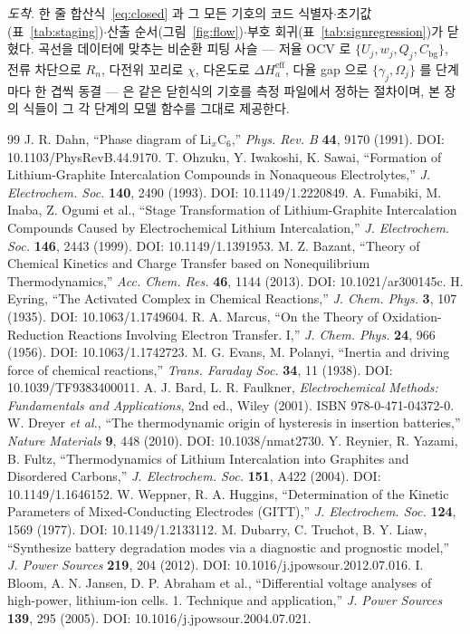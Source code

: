 \documentclass[11pt,a4paper]{article}
\newcommand{\eff}{\mathrm{eff}}
\newcommand{\bg}{\mathrm{bg}}
\begin{document}
\medskip
\emph{도착.} 한 줄 합산식~\eqref{eq:closed} 과 그 모든 기호의 코드 식별자$\cdot$초기값(표~\ref{tab:staging})$\cdot$산출 순서(그림~\ref{fig:flow})$\cdot$부호 회귀(표~\ref{tab:signregression})가 닫혔다. 곡선을 데이터에 맞추는 비순환 피팅 사슬 — 저율 OCV 로 $\{U_j,w_j,Q_j,C_\bg\}$, 전류 차단으로 $R_n$, 다전위 꼬리로 $\chi$, 다온도로 $\Delta H_a^\eff$, 다율 gap 으로 $\{\gamma_j,\Omega_j\}$ 를 단계마다 한 겹씩 동결 — 은 같은 닫힌식의 기호를 측정 파일에서 정하는 절차이며, 본 장의 식들이 그 각 단계의 모델 함수를 그대로 제공한다.

\begin{thebibliography}{99}
 J. R. Dahn, ``Phase diagram of Li$_x$C$_6$,'' \emph{Phys. Rev. B} \textbf{44}, 9170 (1991). DOI: 10.1103/PhysRevB.44.9170.
 T. Ohzuku, Y. Iwakoshi, K. Sawai, ``Formation of Lithium-Graphite Intercalation Compounds in Nonaqueous Electrolytes,'' \emph{J. Electrochem. Soc.} \textbf{140}, 2490 (1993). DOI: 10.1149/1.2220849.
 A. Funabiki, M. Inaba, Z. Ogumi et al., ``Stage Transformation of Lithium-Graphite Intercalation Compounds Caused by Electrochemical Lithium Intercalation,'' \emph{J. Electrochem. Soc.} \textbf{146}, 2443 (1999). DOI: 10.1149/1.1391953.
 M. Z. Bazant, ``Theory of Chemical Kinetics and Charge Transfer based on Nonequilibrium Thermodynamics,'' \emph{Acc. Chem. Res.} \textbf{46}, 1144 (2013). DOI: 10.1021/ar300145c.
 H. Eyring, ``The Activated Complex in Chemical Reactions,'' \emph{J. Chem. Phys.} \textbf{3}, 107 (1935). DOI: 10.1063/1.1749604.
 R. A. Marcus, ``On the Theory of Oxidation-Reduction Reactions Involving Electron Transfer. I,'' \emph{J. Chem. Phys.} \textbf{24}, 966 (1956). DOI: 10.1063/1.1742723.
 M. G. Evans, M. Polanyi, ``Inertia and driving force of chemical reactions,'' \emph{Trans. Faraday Soc.} \textbf{34}, 11 (1938). DOI: 10.1039/TF9383400011.
 A. J. Bard, L. R. Faulkner, \emph{Electrochemical Methods: Fundamentals and Applications}, 2nd ed., Wiley (2001). ISBN 978-0-471-04372-0.
 W. Dreyer \emph{et al.}, ``The thermodynamic origin of hysteresis in insertion batteries,'' \emph{Nature Materials} \textbf{9}, 448 (2010). DOI: 10.1038/nmat2730.
 Y. Reynier, R. Yazami, B. Fultz, ``Thermodynamics of Lithium Intercalation into Graphites and Disordered Carbons,'' \emph{J. Electrochem. Soc.} \textbf{151}, A422 (2004). DOI: 10.1149/1.1646152.
 W. Weppner, R. A. Huggins, ``Determination of the Kinetic Parameters of Mixed-Conducting Electrodes (GITT),'' \emph{J. Electrochem. Soc.} \textbf{124}, 1569 (1977). DOI: 10.1149/1.2133112.
 M. Dubarry, C. Truchot, B. Y. Liaw, ``Synthesize battery degradation modes via a diagnostic and prognostic model,'' \emph{J. Power Sources} \textbf{219}, 204 (2012). DOI: 10.1016/j.jpowsour.2012.07.016.
 I. Bloom, A. N. Jansen, D. P. Abraham et al., ``Differential voltage analyses of high-power, lithium-ion cells. 1. Technique and application,'' \emph{J. Power Sources} \textbf{139}, 295 (2005). DOI: 10.1016/j.jpowsour.2004.07.021.
\end{thebibliography}
\end{document}
